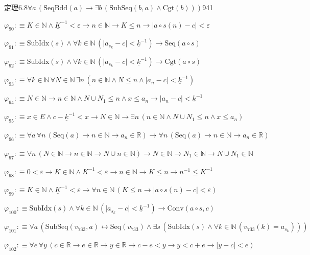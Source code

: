 \begin{fullproof}{定理6.8}{$\forall a\,(\mathrm{SeqBdd}(a) \to \exists b\,(\mathrm{SubSeq}(b,a) \land \mathrm{Cgt}(b)))$}{941}
\begin{abbrevlist}
\item $\varphi_{90} :\equiv K \in \mathbb{N} \land \underline{K}^{-1} < \varepsilon \to n \in \mathbb{N} \to K \leq n \to \lvert a \circ s(n) - c \rvert < \varepsilon$
\item $\varphi_{91} :\equiv \mathrm{SubIdx}(s) \land \forall k \in \mathbb{N}\,(\lvert a_{s_{k}} - c \rvert < \underline{k}^{-1}) \to \mathrm{Seq}(a \circ s)$
\item $\varphi_{92} :\equiv \mathrm{SubIdx}(s) \land \forall k \in \mathbb{N}\,(\lvert a_{s_{k}} - c \rvert < \underline{k}^{-1}) \to \mathrm{Cgt}(a \circ s)$
\item $\varphi_{93} :\equiv \forall k \in \mathbb{N}\,\forall N \in \mathbb{N}\,\exists n\,(n \in \mathbb{N} \land N \leq n \land \lvert a_{n} - c \rvert < \underline{k}^{-1})$
\item $\varphi_{94} :\equiv N \in \mathbb{N} \to n \in \mathbb{N} \land N \cup N_{1} \leq n \land x \leq a_{n} \to \lvert a_{n} - c \rvert < \underline{k}^{-1}$
\item $\varphi_{95} :\equiv x \in E \land c - \underline{k}^{-1} < x \to N \in \mathbb{N} \to \exists n\,(n \in \mathbb{N} \land N \cup N_{1} \leq n \land x \leq a_{n})$
\item $\varphi_{96} :\equiv \forall a\,\forall n\,(\mathrm{Seq}(a) \to n \in \mathbb{N} \to a_{n} \in \mathbb{R}) \to \forall n\,(\mathrm{Seq}(a) \to n \in \mathbb{N} \to a_{n} \in \mathbb{R})$
\item $\varphi_{97} :\equiv \forall n\,(N \in \mathbb{N} \to n \in \mathbb{N} \to N \cup n \in \mathbb{N}) \to N \in \mathbb{N} \to N_{1} \in \mathbb{N} \to N \cup N_{1} \in \mathbb{N}$
\item $\varphi_{98} :\equiv 0 < \varepsilon \to K \in \mathbb{N} \land \underline{K}^{-1} < \varepsilon \to n \in \mathbb{N} \to K \leq n \to \underline{n}^{-1} \leq \underline{K}^{-1}$
\item $\varphi_{99} :\equiv K \in \mathbb{N} \land \underline{K}^{-1} < \varepsilon \to \forall n \in \mathbb{N}\,(K \leq n \to \lvert a \circ s(n) - c \rvert < \varepsilon)$
\item $\varphi_{100} :\equiv \mathrm{SubIdx}(s) \land \forall k \in \mathbb{N}\,(\lvert a_{s_{k}} - c \rvert < \underline{k}^{-1}) \to \mathrm{Conv}(a \circ s,c)$
\item $\varphi_{101} :\equiv \forall a\,(\mathrm{SubSeq}(v_{733},a) \leftrightarrow \mathrm{Seq}(v_{733}) \land \exists s\,(\mathrm{SubIdx}(s) \land \forall k \in \mathbb{N}\,(v_{733}(k) = a_{s_{k}})))$
\item $\varphi_{102} :\equiv \forall e\,\forall y\,(c \in \mathbb{R} \to e \in \mathbb{R} \to y \in \mathbb{R} \to c - e < y \to y < c + e \to \lvert y - c \rvert < e)$

\end{abbrevlist}
\end{fullproof}
